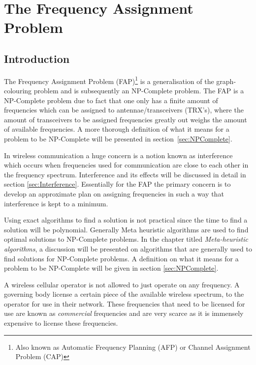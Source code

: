\chapter{The Frequency Assignment Problem}
\label{chpt:fap}
\section{Introduction}
The Frequency Assignment Problem (FAP)\footnote{Also known as Automatic Frequency Planning (AFP) or Channel Assignment Problem (CAP)\cite{ACOvsEA}} is a generalisation of the graph-colouring problem and is subsequently an NP-Complete problem\cite{FAPRAMColouring}. The FAP is a NP-Complete problem due to fact that one only has a finite amount of frequencies which can be assigned to antennae/transceivers (TRX's), where the amount of transceivers to be assigned frequencies greatly out weighs the amount of available frequencies\cite{FAPRAMColouring}. A more thorough definition of what it means for a problem to be NP-Complete will be presented in section~\ref{sec:NPComplete}.

In wireless communication a huge concern is a notion known as interference which occurs when frequencies used for communication are close to each other in the frequency spectrum\cite{Karen2004}. Interference and its effects will be discussed in detail in section \ref{sec:Interference}. Essentially for the FAP the primary concern is to develop an approximate plan on assigning frequencies in such a way that interference is kept to a minimum. 

Using exact algorithms to find a solution is not practical since the time to find a solution will be polynomial. Generally Meta heuristic algorithms are used to find optimal solutions to NP-Complete problems\cite{ACOvsEA}. In the chapter titled \emph{Meta-heuristic algorithms}, a discussion will be presented on algorithms that are generally used to find solutions for NP-Complete problems. A definition on what it means for a problem to be NP-Complete will be given in section \ref{sec:NPComplete}. 

A wireless cellular operator is not allowed to just operate on any frequency. A governing body license a certain piece of the available wireless spectrum, to the operator for use in their network\cite{FAPRAMColouring}. These frequencies that need to be licensed for use are known as \emph{commercial} frequencies and are very scarce as it is immensely expensive to license these frequencies\cite{FAPRAMColouring}. 

